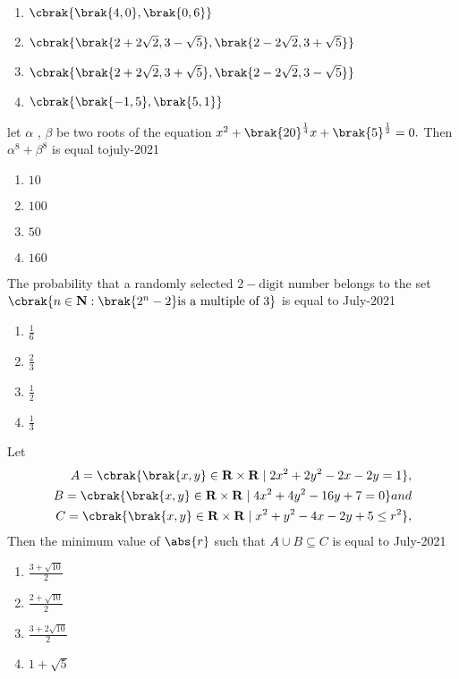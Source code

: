     \begin{enumerate}
        \item $\cbrak{\brak{4,0},{\brak{0,6}}}$
        \item $\cbrak{\brak{2+2\sqrt{2},3-\sqrt{5}},{\brak{2-2\sqrt{2},3+\sqrt{5}}}}$
        \item $\cbrak{\brak{2+2\sqrt{2},3+\sqrt{5}},{\brak{2-2\sqrt{2},3-\sqrt{5}}}}$
        \item $\cbrak{\brak{-1,5},{\brak{5,1}}}$
    \end{enumerate}
\item let $\alpha$ , $\beta$ be two roots of the equation $x^{2} +\brak{20}^{\frac{1}{4}}x+\brak{5}^{\frac{1}{2}} = 0 .$ Then $\alpha^{8}+\beta^{8}$ is equal to\hfill{july-2021}
\begin{multicols}{4}
    \begin{enumerate}
        \item $10$
        \item $100$
        \item $50$
        \item $160$
    \end{enumerate}
\end{multicols}
\item The probability that a randomly selected $2-\text{digit}$ number belongs to the set $\cbrak{n \in \mathbf{N} : \brak{2^{n} - 2} \text{is a multiple of } 3}$ is equal to \hfill{July-2021}
\begin{multicols}{4}
    \begin{enumerate}
        \item $\frac{1}{6}$
        \item $\frac{2}{3}$
        \item $\frac{1}{2}$
        \item $\frac{1}{3}$
    \end{enumerate}
\end{multicols}
\item Let 
\begin{align*}
    A = \cbrak{\brak{x,y} \in \mathbf{R}\times\mathbf{R}\mid 2x^{2}+2y^{2}-2x-2y=1},\\
    B = \cbrak{\brak{x,y} \in \mathbf{R}\times\mathbf{R}\mid 4x^{2}+4y^{2}-16y+7=0} and\\
    C = \cbrak{\brak{x,y} \in \mathbf{R}\times\mathbf{R}\mid x^{2}+y^{2}-4x-2y+5\leq r^{2}},
\end{align*}
Then the minimum value of $\abs{r}$ such that $A \cup B \subseteq C$ is equal  to \hfill{July-2021}
\begin{multicols}{2}
    \begin{enumerate}
        \item $\frac{3+\sqrt{10}}{2}$
        \item $\frac{2+\sqrt{10}}{2}$
        \item $\frac{3+2\sqrt{10}}{2}$
        \item $1+\sqrt{5}$
    \end{enumerate}
\end{multicols}

